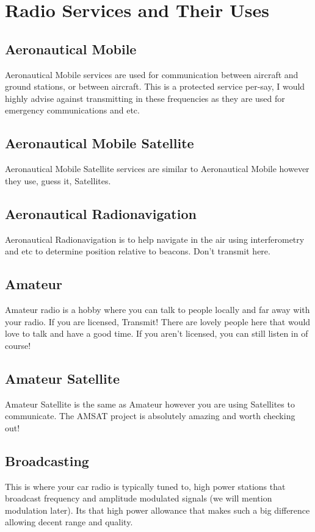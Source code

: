 \documentclass{book}
\begin{document}
    \chapter{Radio Services and Their Uses}
    \section{Aeronautical Mobile}
        Aeronautical Mobile services are used for communication between aircraft and ground stations, or between aircraft.
        This is a protected service per-say, I would highly advise against transmitting in these frequencies 
        as they are used for emergency communications and etc.
    \section{Aeronautical Mobile Satellite}
        Aeronautical Mobile Satellite services are similar to Aeronautical Mobile however they use, guess it, Satellites.
    \section{Aeronautical Radionavigation}
        Aeronautical Radionavigation is to help navigate in the air using interferometry and etc to determine position relative 
        to beacons. Don't transmit here.
    \section{Amateur}
        Amateur radio is a hobby where you can talk to people locally and far away with your radio.
        If you are licensed, Transmit! There are lovely people here that would love
        to talk and have a good time. If you aren't licensed, you can still listen in of course!
    \section{Amateur Satellite}
        Amateur Satellite is the same as Amateur however you are using Satellites to communicate. The AMSAT project is absolutely amazing and worth checking out!
    \section{Broadcasting}
        This is where your car radio is typically tuned to, high power stations that broadcast frequency and amplitude modulated signals (we will mention modulation later).
        Its that high power allowance that makes such a big difference allowing decent range and quality. 
        
\end{document}
